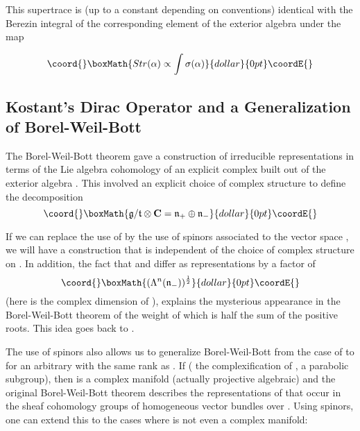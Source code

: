 \documentclass[a4paper,a4paper]{article}
\theoremstyle{conjecture}
\begin{document}
This supertrace is (up to a constant depending on conventions) identical with the Berezin
integral of the corresponding element of the exterior algebra under the map \myHighlight{$\sigma$}\coordHE{}

$$\coord{}\boxMath{Str(\alpha)\propto \int \sigma(\alpha)}{dollar}{0pt}\coordE{}$$


\subsection{Kostant's Dirac Operator and a Generalization of Borel-Weil-Bott}

The Borel-Weil-Bott theorem gave a construction of irreducible
representations in terms of the Lie algebra cohomology of an explicit complex
built out of the exterior algebra \coordHE{}.  This
involved an explicit choice of complex structure to define the
decomposition
$$\coord{}\boxMath{ {\mathfrak g}/{\mathfrak t}\otimes{\mathbf C}={\mathfrak n}_+
\oplus {\mathfrak n}_-}{dollar}{0pt}\coordE{}$$

If we can replace the use of \coordHE{} by the use of
spinors \coordHE{} associated to the vector
space \coordHE{}, we will have a construction
that is independent of the choice of complex structure on \coordHE{}.
In addition, the fact that \coordHE{} and  \coordHE{}
differ as \coordHE{} representations by a factor of
$$\coord{}\boxMath{(\Lambda^n(\mathfrak n_-))^\frac{1}{2}}{dollar}{0pt}\coordE{}$$
(here \coordHE{} is the complex dimension of \coordHE{}), explains the
mysterious appearance in the Borel-Weil-Bott theorem of the weight
of \coordHE{} which is half the sum of the positive roots.  This idea goes back to \cite{Bott2}.

The use of spinors also allows us to generalize Borel-Weil-Bott from the
case of \coordHE{} to \coordHE{} for an arbitrary \coordHE{} with the same rank as \coordHE{}.
If \coordHE{} (\coordHE{} the complexification of \coordHE{},
\coordHE{} a parabolic subgroup), then \coordHE{} is a complex manifold (actually
projective algebraic) and the original Borel-Weil-Bott theorem \cite{Bott1}
describes the representations of \coordHE{} that occur in the sheaf cohomology groups
of homogeneous vector bundles over \coordHE{}.  Using spinors, one can extend
this \cite{GKRS} to the cases where \coordHE{} is not even a complex manifold:
\end{document}
